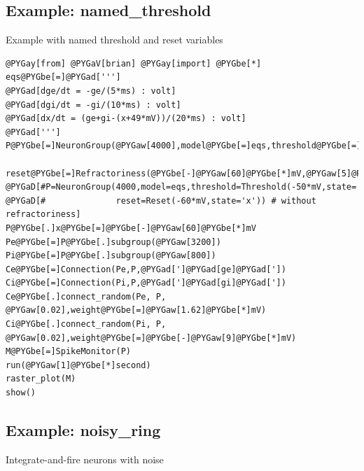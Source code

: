 \documentclass[letterpaper,10pt]{manual}
\begin{document}
\resetcurrentobjects
{}

\hypertarget{index-40}{}\subsection{Example: named\_threshold}

Example with named threshold and reset variables

\begin{Verbatim}[commandchars=@\[\]]
@PYGay[from] @PYGaV[brian] @PYGay[import] @PYGbe[*]
eqs@PYGbe[=]@PYGad[''']
@PYGad[dge/dt = -ge/(5*ms) : volt]
@PYGad[dgi/dt = -gi/(10*ms) : volt]
@PYGad[dx/dt = (ge+gi-(x+49*mV))/(20*ms) : volt]
@PYGad[''']
P@PYGbe[=]NeuronGroup(@PYGaw[4000],model@PYGbe[=]eqs,threshold@PYGbe[=]Threshold(@PYGbe[-]@PYGaw[50]@PYGbe[*]mV,state@PYGbe[=]@PYGad[']@PYGad[x]@PYGad[']),\
              reset@PYGbe[=]Refractoriness(@PYGbe[-]@PYGaw[60]@PYGbe[*]mV,@PYGaw[5]@PYGbe[*]ms,state@PYGbe[=]@PYGad[']@PYGad[x]@PYGad[']))
@PYGaD[#P=NeuronGroup(4000,model=eqs,threshold=Threshold(-50*mV,state='x'),\]
@PYGaD[#              reset=Reset(-60*mV,state='x')) # without refractoriness]
P@PYGbe[.]x@PYGbe[=]@PYGbe[-]@PYGaw[60]@PYGbe[*]mV
Pe@PYGbe[=]P@PYGbe[.]subgroup(@PYGaw[3200])
Pi@PYGbe[=]P@PYGbe[.]subgroup(@PYGaw[800])
Ce@PYGbe[=]Connection(Pe,P,@PYGad[']@PYGad[ge]@PYGad['])
Ci@PYGbe[=]Connection(Pi,P,@PYGad[']@PYGad[gi]@PYGad['])
Ce@PYGbe[.]connect_random(Pe, P, @PYGaw[0.02],weight@PYGbe[=]@PYGaw[1.62]@PYGbe[*]mV)
Ci@PYGbe[.]connect_random(Pi, P, @PYGaw[0.02],weight@PYGbe[=]@PYGbe[-]@PYGaw[9]@PYGbe[*]mV)
M@PYGbe[=]SpikeMonitor(P)
run(@PYGaw[1]@PYGbe[*]second)
raster_plot(M)
show()
\end{Verbatim}

\resetcurrentobjects
{}

\hypertarget{index-41}{}\subsection{Example: noisy\_ring}

Integrate-and-fire neurons with noise
\end{document}
